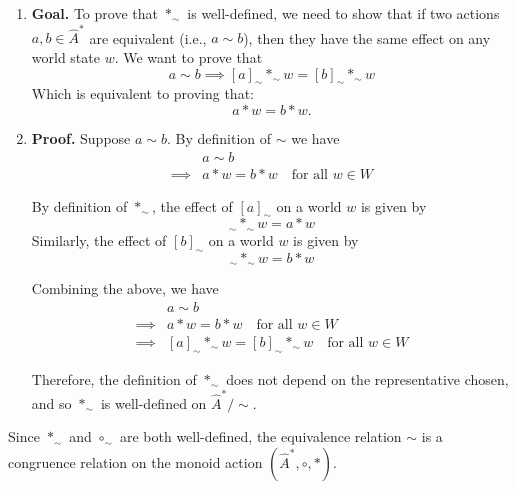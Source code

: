 \begin{proofE}
\begin{enumerate}
    \item \textbf{Goal.}
    To prove that $\ast_{\sim}$ is well-defined, we need to show that if two actions $a, b \in \hat{A}^{*}$ are equivalent (i.e., $a \sim b$), then they have the same effect on any world state $w$.
    We want to prove that
    \begin{equation}
        a \sim b \implies [a]_{\sim} \ast_{\sim} w = [b]_{\sim} \ast_{\sim} w
    \end{equation}
    Which is equivalent to proving that:
    \begin{equation}
        a \ast w = b \ast w.
    \end{equation}

    \item \textbf{Proof.}
    Suppose $a \sim b$.
    By definition of $\sim$ we have
    \begin{align}
        & a \sim b \\
        \implies & a \ast w = b \ast w \quad \text{for all } w \in W
    \end{align}

    By definition of $\ast_{\sim}$, the effect of $[a]_{\sim}$ on a world $w$ is given by
    \begin{equation}
      [a]_{\sim} \ast_{\sim} w = a \ast w
    \end{equation}
    Similarly, the effect of $[b]_{\sim}$ on a world $w$ is given by
    \begin{equation}
      [b]_{\sim} \ast_{\sim} w = b \ast w
    \end{equation}

    Combining the above, we have
    \begin{align}
        & a \sim b \\
        \implies & a \ast w = b \ast w \quad \text{for all } w \in W \\
        \implies & [a]_{\sim} \ast_{\sim} w = [b]_{\sim} \ast_{\sim} w \quad \text{for all } w \in W
    \end{align}

    Therefore, the definition of $\ast_{\sim}$ does not depend on the representative chosen, and so $\ast_{\sim}$ is well-defined on $\hat{A}^{*}/\sim$.
\end{enumerate}
\end{proofE}

Since $\ast_{\sim}$ and $\circ_{\sim}$ are both well-defined, the equivalence relation $\sim$ is a congruence relation on the monoid action $(\hat{A}^{*}, \circ, \ast)$. 

